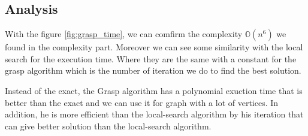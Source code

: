 
\subsection{Analysis}

With the figure \ref{fig:grasp_time}, we can comfirm the complexity $\mathbb{O}(n^6)$ we found in the complexity part.
Moreover we can see some similarity with the local search for the execution time. Where they are the same with a constant for the grasp algorithm 
which is the number of iteration we do to find the best solution.
\bigskip

Instead of the exact, the Grasp algorithm has a polynomial exuction time that is better than the exact and we can use it for graph with a lot of vertices.
In addition, he is more efficient than the local-search algorithm by his iteration that can give better solution than the local-search algorithm.
